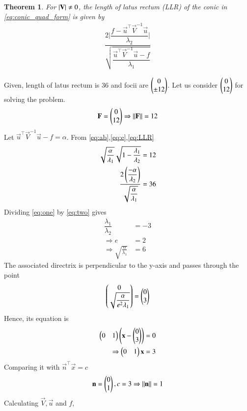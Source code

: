 \documentclass[journal,12pt,twocolumn]{IEEEtran}
\newtheorem{theorem}{Theorem}[section]
\begin{document}
\begin{theorem}
For $\vert\mathbf{V}\vert \ne 0$, the length of latus rectum (LLR) of the conic in \eqref{eq:conic_quad_form} is given by 
\begin{align} 
\dfrac{2\bigg | \dfrac{f-\vec{u}^{\top}\vec{V}^{-1}\vec{u}}{\lambda_2}\bigg | }{{\sqrt{\dfrac{\vec{u}^{\top}\vec{V}^{-1}\vec{u} -f}{\lambda_1}}}}
\label{eq:LLR}
\end{align} 
\end{theorem}
Given, length of latus rectum is 36 and focii are $\begin{pmatrix}0\\ \pm12\end{pmatrix}$. Let us consider $\begin{pmatrix}0\\ 12\end{pmatrix}$ for solving the problem.
\begin{align}
    \mathbf{F} =\begin{pmatrix}0\\ 12\end{pmatrix}\Rightarrow\lVert\mathbf{F}\rVert=12
\end{align}
Let $\vec{u}^{\top}\vec{V}^{-1}\vec{u}-f=\alpha$. From \eqref{eq:ab},\eqref{eq:e},\eqref{eq:LLR}
\begin{align}
    \sqrt{\dfrac{\alpha}{\lambda_1}}\sqrt{1-\frac{\lambda_1}{\lambda_2}}=12\label{eq:one}\\
    \dfrac{2\left(\dfrac{-\alpha}{\lambda_2}\right)}{\sqrt{\dfrac{\alpha}{\lambda_1}}}=36\label{eq:two}
\end{align}
Dividing \eqref{eq:one} by \eqref{eq:two} gives
\begin{align}
    \dfrac{\lambda_1}{\lambda_2}&=-3\\
    \Rightarrow e&=2\label{eq:q}\\
    \Rightarrow \sqrt{\frac{\alpha}{\lambda_1}}&=6\label{eq:w}
\end{align}
The associated directrix is perpendicular to the y-axis and passes through the point
\begin{align}
\begin{pmatrix}0\\\sqrt{\dfrac{\alpha}{e^2\lambda_1}}\end{pmatrix}=\begin{pmatrix}0\\3\end{pmatrix}
\end{align}
Hence, its equation is
\begin{align}
    \begin{pmatrix}0&1\end{pmatrix}\left(\mathbf{x}-\begin{pmatrix}0\\3\end{pmatrix}\right) &= 0\\
    \Rightarrow \begin{pmatrix}0&1\end{pmatrix}\mathbf{x} &= 3
\end{align}
Comparing it with $\vec{n}^{\top}\vec{x} = c$
\begin{align}
    \mathbf{n} = \begin{pmatrix}0\\1\end{pmatrix}, c = 3\Rightarrow \lVert\mathbf{n}\rVert = 1
\end{align}
Calculating $\vec{V}, \vec{u}$ and $f$,
\end{document}
